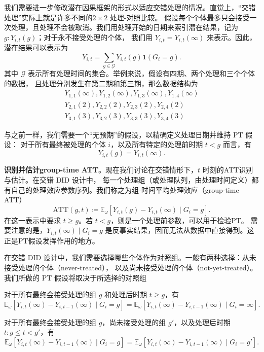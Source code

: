 \documentclass[../didNotes.tex]{subfiles}
\begin{document}
我们需要进一步修改潜在因果框架的形式以适应交错处理的情况。直觉上，``交错处理''实际上就是许多不同的\( 2 \times 2 \) 处理-对照比较。
假设每个个体最多只会接受一次处理，且处理不会被取消。我们用处理开始的日期来索引潜在结果，记为 \( g: Y_{i,t}(g) \)；对于永不接受处理的个体，
我们用 \( Y_{i,t}=Y_{i,t}(\infty) \) 来表示。因此，潜在结果可以表示为
\[
  Y_{i,t} = \sum_{g \in \mathcal{G}} Y_{i,t}(g) \mathbf{1}(G_{i}=g)
.\]
其中 \( \mathcal{G} \) 表示所有处理时间的集合。举例来说，假设有四期、两个处理和三个个体的数据，
且处理分别发生在第二期和第三期，那么数据结构为
\begin{align*}
  Y_{1,1}(\infty),Y_{1,2}(\infty),Y_{1,3}(\infty),Y_{1,4}(\infty) \\
  Y_{2,1}(2), Y_{2,2}(2), Y_{2,3}(2), Y_{2,4}(2) \\
  Y_{3,1}(3), Y_{3,2}(3), Y_{3,3}(3), Y_{3,4}(3)
\end{align*}

与之前一样，我们需要一个“无预期”的假设，以精确定义处理日期并维持 PT 假设：
对于所有最终被处理的个体 \( i \)，以及所有特定的处理前时期 \( t < g \) 而言，有
\[
  Y_{i,t}(g) = Y_{i,t}(\infty)
.\]

\textbf{识别并估计group-time ATT}。现在我们讨论在交错情形下，\( t \) 时刻的ATT识别与估计。在交错 DID 设计中，
每一个处理组（或处理队列，由处理时间定义）都有自己的处理效应参数序列。我们称之为组-时间平均处理效应（group-time ATT）
\[
  \text{ATT}(g,t) \coloneqq \mathbb{E}_{\omega}[Y_{i,t}(g)-Y_{i,t}(\infty) \mid G_i = g]
.\]
在这一表示中要求 \( t \ge g \)。若 \( t < g \)，则是一个处理前参数，可以用于检验PT。
需要注意的是，\( Y_{i,t}(\infty) \mid G_i=g \) 是反事实结果，因而无法从数据中直接得到。这正是PT假设发挥作用的地方。

在交错 DID 设计中，我们需要选择哪些个体作为对照组。一般有两种选择：从未接受处理的个体（never-treated），
以及尚未接受处理的个体（not-yet-treated）。我们所做的 PT 假设将取决于所选择的对照组
\begin{assumption}\label{thm:pt-nev}
  对于所有最终会接受处理的组 \( g \) 和处理后时期 \( t \ge g \)，有
  \[
    \mathbb{E}_{\omega}[Y_{i,t}(\infty)-Y_{i,t-1}(\infty) \mid G_i=g] =
    \mathbb{E}_{\omega}[Y_{i,t}(\infty)-Y_{i,t-1}(\infty) \mid G_i=\infty]
  .\]
\end{assumption}

\begin{assumption}\label{thm:pt-not-yet}
  对于所有最终会接受处理的组 \( g \)，尚未接受处理的组 \( g' \)，以及处理后时期
  \( t: g \le t < g' \)，有
  \[
    \mathbb{E}_{\omega}[Y_{i,t}(\infty)-Y_{i,t-1}(\infty) \mid G_i=g] =
    \mathbb{E}_{\omega}[Y_{i,t}(\infty)-Y_{i,t-1}(\infty) \mid G_i=g']
  .\]
\end{assumption}
\end{document}
